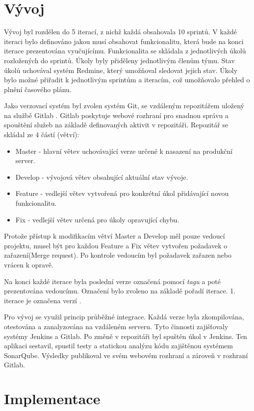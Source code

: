 \documentclass[thesis=B,czech]{FITthesis}[2012/06/26]
\begin{document}
\section{Vývoj}
Vývoj byl rozdělen do 5 iterací, z nichž každá obsahovala 10 sprintů. 
V každé iteraci bylo definováno jakou musí obsahovat funkcionalitu, která bude na konci iterace prezentována vyučujícímu. Funkcionalita se skládala z jednotlivých úkolů rozložených do sprintů.
Úkoly byly přiděleny jednotlivým členům týmu. Stav úkolů uchovával systém Redmine\cite{Redmine}, který umožňoval sledovat jejich stav.
Úkoly bylo možné přiřadit k jednotlivým sprintům a iteracím, což umožňovalo přehled o plnění časového plánu.
\par
Jako verzovací systém byl zvolen systém Git, se vzdáleným repozitářem uložený na službě Gitlab \cite{gitlab}. Gitlab poskytuje webové rozhraní pro snadnou správu a spouštění služeb na základě definovaných aktivit v repozitáři. Repozitář se skládal ze 4 částí (větví):
\begin{itemize}
\item Master - hlavní větev uchovávající verze určené k nasazení na produkční server.
\item Develop - vývojová větev obsahující aktuální stav vývoje.
\item Feature - vedlejší větev vytvořená pro konkrétní úkol přidávající novou funkcionalitu.
\item Fix - vedlejší větev určená pro úkoly opravující chybu.
\end{itemize}
Protože přístup k modifikacím větví Master a Develop měl pouze vedoucí projektu, musel být pro každou Feature a Fix větev
vytvořen požadavek o zařazení(Merge request). Po kontrole vedoucím byl požadavek zařazen nebo vrácen k opravě.
\par
Na konci každé iterace byla poslední verze označená pomocí \textit{tagu} a poté prezentována vedoucímu.
Označení bylo zvoleno na základě pořadí iterace. 1. iterace je označena verzí .
\par
Pro vývoj se využil princip průběžné integrace. Každá verze byla zkompilována, otestována a zanalyzována na vzdáleném serveru.
Tyto činnosti zajišťovaly systémy Jenkins\cite{jenkins} a Gitlab. Po změně v repozitáři byl spuštěn úkol v Jenkins. Ten aplikaci sestavil, spustil testy a statickou analýzu kódu 
zajištěnou systémem SonarQube\cite{sonar}. Výsledky publikoval ve svém webovém rozhraní a zároveň v rozhraní Gitlab.  
\section{Implementace}
\end{document}
